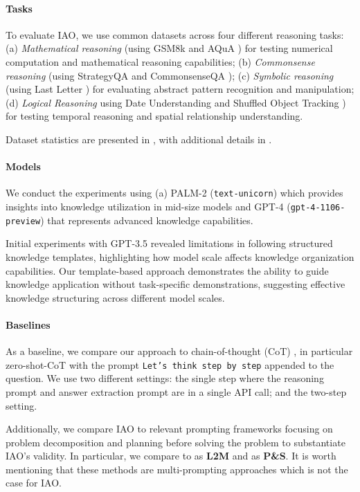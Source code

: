 \paragraph{Tasks}

To evaluate IAO, we use common datasets across four different reasoning tasks: (a) \textit{Mathematical reasoning} (using GSM8k \cite{cobbe2021training} and AQuA \cite{ling2017program}) for testing numerical computation and mathematical reasoning capabilities; 
(b) \textit{Commonsense reasoning} (using StrategyQA \cite{geva2021did} and  CommonsenseQA \cite{talmor2019commonsenseqa}); (c) \textit{Symbolic reasoning} (using Last Letter \cite{wei2022chain}) for  evaluating abstract pattern recognition and manipulation; (d) \textit{Logical Reasoning} using Date Understanding and Shuffled Object Tracking \cite{srivastava2023beyond}) for testing temporal reasoning and spatial relationship understanding.

Dataset statistics are presented in , with additional details in .

\paragraph{Models}

We conduct the experiments using (a) PALM-2 \cite{anil2023palm} (\texttt{text-unicorn}) which provides insights into knowledge utilization in mid-size models and GPT-4 (\texttt{gpt-4-1106-preview}) \cite{achiam2023gpt} that represents advanced knowledge capabilities.

Initial experiments with GPT-3.5 revealed limitations in following structured knowledge templates, highlighting how model scale affects knowledge organization capabilities. Our template-based approach demonstrates the ability to guide knowledge application without task-specific demonstrations, suggesting effective knowledge structuring across different model scales.

\paragraph{Baselines}


As a baseline, we compare our approach to chain-of-thought (CoT) \cite{wei2022chain}, in particular zero-shot-CoT \cite{kojima2022large} with the prompt \texttt{Let's think step by step} appended to the question. We use two different settings: the single step where the reasoning prompt and answer extraction prompt are in a single API call; and the two-step setting.

Additionally, we compare IAO to relevant prompting frameworks focusing on problem decomposition and planning before solving the problem to substantiate IAO's validity. In particular, we compare to \cite{zhou2022least} as \textbf{L2M} and \cite{wang2023plan} as \textbf{P\&S}.  
It is worth mentioning that these methods are multi-prompting approaches which is not the case for IAO. 
